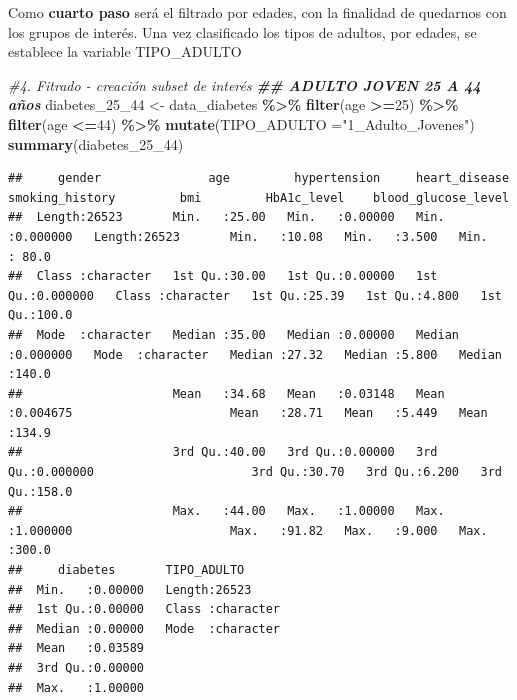 \documentclass[
]{article}
\newenvironment{Shaded}{\begin{snugshade}}{\end{snugshade}}
\newcommand{\AttributeTok}[1]{\textcolor[rgb]{0.13,0.29,0.53}{#1}}
\newcommand{\CommentTok}[1]{\textcolor[rgb]{0.56,0.35,0.01}{\textit{#1}}}
\newcommand{\DecValTok}[1]{\textcolor[rgb]{0.00,0.00,0.81}{#1}}
\newcommand{\DocumentationTok}[1]{\textcolor[rgb]{0.56,0.35,0.01}{\textbf{\textit{#1}}}}
\newcommand{\FunctionTok}[1]{\textcolor[rgb]{0.13,0.29,0.53}{\textbf{#1}}}
\newcommand{\NormalTok}[1]{#1}
\newcommand{\OtherTok}[1]{\textcolor[rgb]{0.56,0.35,0.01}{#1}}
\newcommand{\SpecialCharTok}[1]{\textcolor[rgb]{0.81,0.36,0.00}{\textbf{#1}}}
\newcommand{\StringTok}[1]{\textcolor[rgb]{0.31,0.60,0.02}{#1}}
\begin{document}
Como \textbf{cuarto paso} será el filtrado por edades, con la finalidad
de quedarnos con los grupos de interés. Una vez clasificado los tipos de
adultos, por edades, se establece la variable TIPO\_ADULTO

\begin{Shaded}
\begin{Highlighting}[]
\CommentTok{\#4. Fitrado {-} creación subset de interés}
\DocumentationTok{\#\# ADULTO JOVEN 25 A 44 años}
\NormalTok{diabetes\_25\_44 }\OtherTok{\textless{}{-}}\NormalTok{ data\_diabetes }\SpecialCharTok{\%\textgreater{}\%} \FunctionTok{filter}\NormalTok{(age }\SpecialCharTok{\textgreater{}=}\DecValTok{25}\NormalTok{) }\SpecialCharTok{\%\textgreater{}\%} \FunctionTok{filter}\NormalTok{(age }\SpecialCharTok{\textless{}=}\DecValTok{44}\NormalTok{) }\SpecialCharTok{\%\textgreater{}\%} \FunctionTok{mutate}\NormalTok{(}\AttributeTok{TIPO\_ADULTO =}\StringTok{"1\_Adulto\_Jovenes"}\NormalTok{)}
\FunctionTok{summary}\NormalTok{(diabetes\_25\_44)}
\end{Highlighting}
\end{Shaded}

\begin{verbatim}
##     gender               age         hypertension     heart_disease      smoking_history         bmi         HbA1c_level    blood_glucose_level
##  Length:26523       Min.   :25.00   Min.   :0.00000   Min.   :0.000000   Length:26523       Min.   :10.08   Min.   :3.500   Min.   : 80.0      
##  Class :character   1st Qu.:30.00   1st Qu.:0.00000   1st Qu.:0.000000   Class :character   1st Qu.:25.39   1st Qu.:4.800   1st Qu.:100.0      
##  Mode  :character   Median :35.00   Median :0.00000   Median :0.000000   Mode  :character   Median :27.32   Median :5.800   Median :140.0      
##                     Mean   :34.68   Mean   :0.03148   Mean   :0.004675                      Mean   :28.71   Mean   :5.449   Mean   :134.9      
##                     3rd Qu.:40.00   3rd Qu.:0.00000   3rd Qu.:0.000000                      3rd Qu.:30.70   3rd Qu.:6.200   3rd Qu.:158.0      
##                     Max.   :44.00   Max.   :1.00000   Max.   :1.000000                      Max.   :91.82   Max.   :9.000   Max.   :300.0      
##     diabetes       TIPO_ADULTO       
##  Min.   :0.00000   Length:26523      
##  1st Qu.:0.00000   Class :character  
##  Median :0.00000   Mode  :character  
##  Mean   :0.03589                     
##  3rd Qu.:0.00000                     
##  Max.   :1.00000
\end{verbatim}
\end{document}
